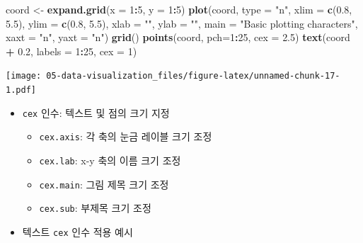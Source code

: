 \documentclass[
  11pt,
]{krantz}
\newenvironment{Shaded}{\begin{snugshade}}{\end{snugshade}}
\newcommand{\DataTypeTok}[1]{\textcolor[rgb]{0.27,0.27,0.27}{#1}}
\newcommand{\DecValTok}[1]{\textcolor[rgb]{0.06,0.06,0.06}{#1}}
\newcommand{\FloatTok}[1]{\textcolor[rgb]{0.06,0.06,0.06}{#1}}
\newcommand{\KeywordTok}[1]{\textcolor[rgb]{0.27,0.27,0.27}{\textbf{#1}}}
\newcommand{\NormalTok}[1]{#1}
\newcommand{\OperatorTok}[1]{\textcolor[rgb]{0.43,0.43,0.43}{\textbf{#1}}}
\newcommand{\StringTok}[1]{\textcolor[rgb]{0.5,0.5,0.5}{#1}}
\providecommand{\tightlist}{%
  \setlength{\itemsep}{0pt}\setlength{\parskip}{0pt}}
\begin{document}
\begin{Shaded}
\begin{Highlighting}[]
\NormalTok{coord <-}\StringTok{ }\KeywordTok{expand.grid}\NormalTok{(}\DataTypeTok{x =} \DecValTok{1}\OperatorTok{:}\DecValTok{5}\NormalTok{, }\DataTypeTok{y =} \DecValTok{1}\OperatorTok{:}\DecValTok{5}\NormalTok{)}
\KeywordTok{plot}\NormalTok{(coord, }\DataTypeTok{type =} \StringTok{"n"}\NormalTok{, }
     \DataTypeTok{xlim =} \KeywordTok{c}\NormalTok{(}\FloatTok{0.8}\NormalTok{, }\FloatTok{5.5}\NormalTok{), }
     \DataTypeTok{ylim =} \KeywordTok{c}\NormalTok{(}\FloatTok{0.8}\NormalTok{, }\FloatTok{5.5}\NormalTok{), }
     \DataTypeTok{xlab =} \StringTok{""}\NormalTok{, }
     \DataTypeTok{ylab =} \StringTok{""}\NormalTok{, }
     \DataTypeTok{main =} \StringTok{"Basic plotting characters"}\NormalTok{, }
     \DataTypeTok{xaxt =} \StringTok{"n"}\NormalTok{, }
     \DataTypeTok{yaxt =} \StringTok{"n"}\NormalTok{)}
\KeywordTok{grid}\NormalTok{()}
\KeywordTok{points}\NormalTok{(coord, }\DataTypeTok{pch=}\DecValTok{1}\OperatorTok{:}\DecValTok{25}\NormalTok{, }\DataTypeTok{cex =} \FloatTok{2.5}\NormalTok{)}
\KeywordTok{text}\NormalTok{(coord }\OperatorTok{+}\StringTok{ }\FloatTok{0.2}\NormalTok{, }\DataTypeTok{labels =} \DecValTok{1}\OperatorTok{:}\DecValTok{25}\NormalTok{, }\DataTypeTok{cex =} \DecValTok{1}\NormalTok{)}
\end{Highlighting}
\end{Shaded}

\texttt{[image: 05-data-visualization\_files/figure-latex/unnamed-chunk-17-1.pdf]}

\normalsize

\begin{itemize}
\tightlist
\item
  \texttt{cex} 인수: 텍스트 및 점의 크기 지정

  \begin{itemize}
  \tightlist
  \item
    \texttt{cex.axis}: 각 축의 눈금 레이블 크기 조정
  \item
    \texttt{cex.lab}: x-y 축의 이름 크기 조정
  \item
    \texttt{cex.main}: 그림 제목 크기 조정
  \item
    \texttt{cex.sub}: 부제목 크기 조정
  \end{itemize}
\item
  텍스트 \texttt{cex} 인수 적용 예시
\end{itemize}

\footnotesize
\end{document}
